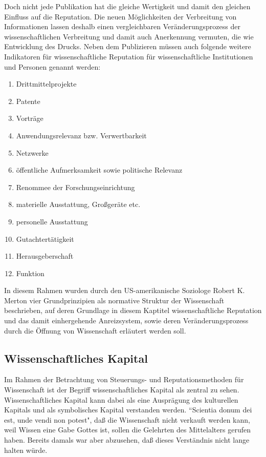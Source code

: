 Doch nicht jede Publikation hat die gleiche Wertigkeit\cite{suchen} und damit den gleichen Einfluss auf die Reputation. Die neuen Möglichkeiten der Verbreitung von Informationen lassen deshalb einen vergleichbaren Veränderungsprozess der wissenschaftlichen Verbreitung und damit auch Anerkennung vermuten, die wie Entwicklung des Drucks.\cite{hanekop_2006} Neben dem Publizieren müssen auch folgende weitere Indikatoren für wissenschaftliche Reputation für wissenschaftliche Institutionen und Personen genannt werden\cite{hanekop_2008}:
\begin{enumerate}
\item Drittmittelprojekte
\item Patente
\item Vorträge
\item Anwendungsrelevanz bzw. Verwertbarkeit
\item Netzwerke
\item öffentliche Aufmerksamkeit sowie politische Relevanz 
\item Renommee der Forschungseinrichtung
\item materielle Ausstattung, Großgeräte etc.
\item personelle Ausstattung
\item Gutachtertätigkeit
\item Herausgeberschaft
\item Funktion
\end{enumerate}
In diesem Rahmen wurden durch den US-amerikanische Soziologe Robert K. Merton vier Grundprinzipien als normative Struktur der Wissenschaft beschrieben\cite{Merton_1985}, auf deren Grundlage in diesem Kaptitel wissenschaftliche Reputation und das damit einhergehende Anreizsystem, sowie deren Veränderungsprozess durch die Öffnung von Wissenschaft erläutert werden soll. 

\subsection{Wissenschaftliches Kapital}
Im Rahmen der Betrachtung von Steuerungs- und Reputationsmethoden für Wissenschaft ist der Begriff wissenschaftliches Kapital als zentral zu sehen\cite{suchen}. Wissenschaftliches Kapital kann dabei als eine Ausprägung des kulturellen Kapitals und als symbolisches Kapital\cite{irmer2011} verstanden werden. “Scientia donum dei est, unde vendi non potest", daß die Wissenschaft nicht verkauft werden kann, weil Wissen eine Gabe Gottes ist, sollen die Gelehrten des Mittelalters gerufen haben\cite{suchen}. Bereits damals war aber abzusehen, daß dieses Verständnis nicht lange halten würde.

